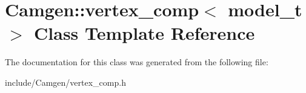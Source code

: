 \hypertarget{a00586}{}\section{Camgen\+:\+:vertex\+\_\+comp$<$ model\+\_\+t $>$ Class Template Reference}
\label{a00586}


The documentation for this class was generated from the following file\+:\begin{DoxyCompactItemize}
\item 
include/\+Camgen/vertex\+\_\+comp.\+h\end{DoxyCompactItemize}
